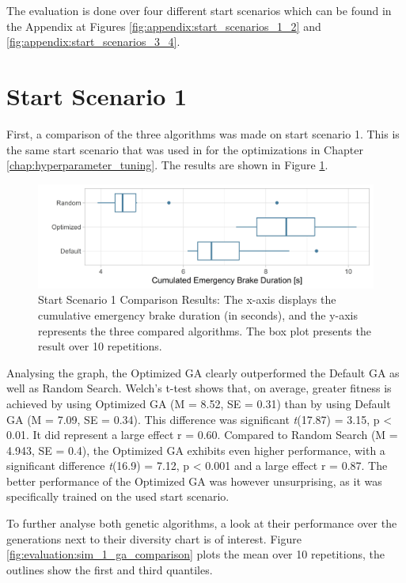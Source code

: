 The evaluation is done over four different start scenarios which can be found in the Appendix at Figures \ref{fig:appendix:start_scenarios_1_2} and \ref{fig:appendix:start_scenarios_3_4}.

\section{Start Scenario 1}
First, a comparison of the three algorithms was made on start scenario 1. This is the same start scenario that was used in for the optimizations in Chapter \ref{chap:hyperparameter_tuning}. The results are shown in Figure \ref{fig:evaluation:sim_1_comparison}.

\begin{figure}[ht] 
	\includegraphics[width=1\linewidth]{simulations/evaluation/plots/sim_1_comparison}
	\caption{Start Scenario 1 Comparison Results: The x-axis displays the cumulative emergency brake duration (in seconds), and the y-axis represents the three compared algorithms. The box plot presents the result over 10 repetitions.}
	\label{fig:evaluation:sim_1_comparison}
\end{figure}


Analysing the graph, the Optimized GA clearly outperformed the Default GA as well as Random Search. Welch's t-test shows that, on average, greater fitness is achieved by using Optimized GA (M = 8.52, SE = 0.31) than by using Default GA (M = 7.09, SE = 0.34). This difference was significant \textit{t}(17.87) = 3.15, p < 0.01. It did represent a large effect r = 0.60. Compared to Random Search (M = 4.943, SE = 0.4), the Optimized GA exhibits even higher performance, with a significant difference \textit{t}(16.9) = 7.12, p < 0.001 and a large effect r = 0.87. The better performance of the Optimized GA was however unsurprising, as it was specifically trained on the used start scenario.

To further analyse both genetic algorithms, a look at their performance over the generations next to their diversity chart is of interest. Figure \ref{fig:evaluation:sim_1_ga_comparison} plots the mean over 10 repetitions, the outlines show the first and third quantiles.

